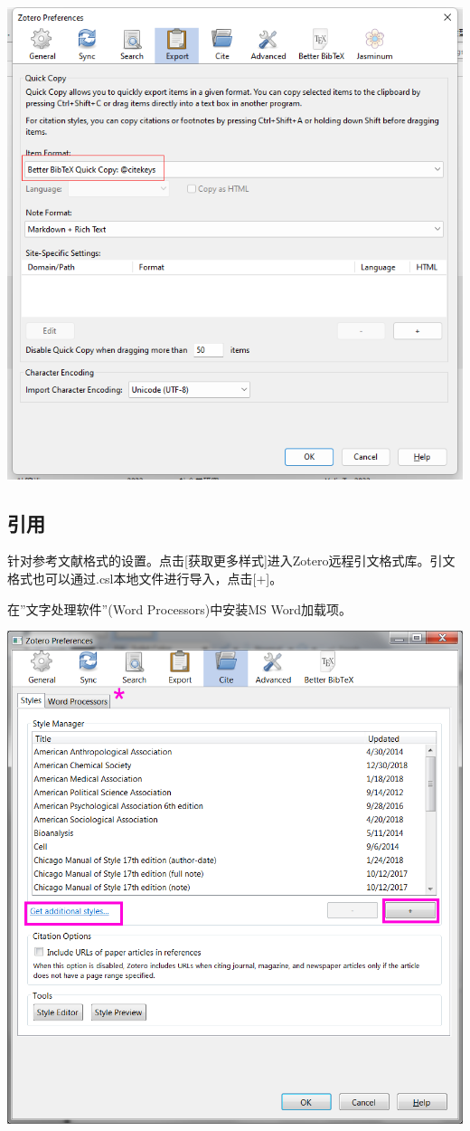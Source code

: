 \documentclass[
  letterpaper,
  DIV=11,
  numbers=noendperiod,
  oneside]{scrreprt}
\begin{document}
\includegraphics{./images/zotero_export.png}

\hypertarget{ux5f15ux7528}{%
\subsection{引用}\label{ux5f15ux7528}}

针对参考文献格式的设置。点击{[}获取更多样式{]}进入Zotero远程引文格式库。引文格式也可以通过.csl本地文件进行导入，点击{[}+{]}。

在''文字处理软件''(Word Processors)中安装MS Word加载项。

\includegraphics{./images/zotero_cite.png}
\end{document}

